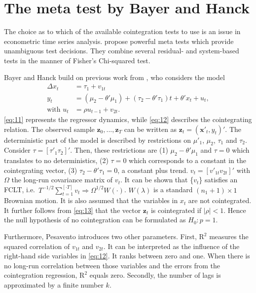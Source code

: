 \documentclass[12pt,a4paper]{article}
\begin{document}
\hypertarget{the-meta-test-by-bayer-and-hanck}{%
\section{The meta test by Bayer and
Hanck}\label{the-meta-test-by-bayer-and-hanck}}

The choice as to which of the available cointegration tests to use is an
issue in econometric time series analysis. \textcite{Bayerhanck_2012}
propose powerful meta tests which provide unambiguous test decisions.
They combine several residual- and system-based tests in the manner of
Fisher's \autocite*{Fisher_1932} Chi-squared test.

Bayer and Hanck build on previous work from \textcite{Pesavento_2004},
who considers the model \begin{align}
\Delta x_t &= \tau_1 + v_{1t} \label{eq:11} \\
y_t &= (\mu_2 - \theta' \mu_1) + (\tau_2 - \theta' \tau_1) t + \theta' x_t + u_t, \label{eq:12} \\
\text{with } u_t &= \rho u_{t-1} + v_{2t}. \label{eq:13}
\end{align} \eqref{eq:11} represents the regressor dynamics, while
\eqref{eq:12} describes the cointegrating relation. The observed sample
\(\mathbf{z}_0,..., \mathbf{z}_T\) can be written as
\(\mathbf{z}_t = (\mathbf{x}'_t, y_t)'\). The deterministic part of the
model is described by restrictions on \(\mu'_1\), \(\mu_2\), \(\tau_1\)
and \(\tau_2\). Consider \(\tau = [\tau'_1 \tau_2]'\). Then, these
restrictions are (1) \(\mu_2 - \theta' \mu_1\) and \(\tau = 0\) which
translates to no deterministics, (2) \(\tau = 0\) which corresponds to a
constant in the cointegrating vector, (3)
\(\tau_2 - \theta' \tau_1 = 0\), a constant plus trend.
\(v_t = [v'_{1t} v_{2t}]'\) with \(\Omega\) the long-run covariance
matrix of \(v_t\). It can be shown that \{\(v_t\)\} satisfies an FCLT,
i.e.~\(T^{-1/2} \sum^{[\cdot T]}_{t=1} v_t \Rightarrow \Omega^{1/2} W(\cdot)\).
\(W(\lambda)\) is a standard \((n_1 + 1) \times 1\) Brownian motion. It
is also assumed that the variables in \(x_t\) are not cointegrated. It
further follows from \eqref{eq:13} that the vector \(\mathbf{z}_t\) is
cointegrated if \(|\rho| < 1\). Hence the null hypothesis of no
cointegration can be formulated as \(H_0: p = 1\).

Furthermore, Pesavento introduces two other parameters. First,
\(\text{R}^2\) measures the squared correlation of \(v_{1t}\) and
\(v_{2t}\). It can be interpreted as the influence of the right-hand
side variables in \eqref{eq:12}. It ranks between zero and one. When
there is no long-run correlation between those variables and the errors
from the cointegration regression, \(\text{R}^2\) equals zero. Secondly,
the number of lags is approximated by a finite number \(k\).
\end{document}
